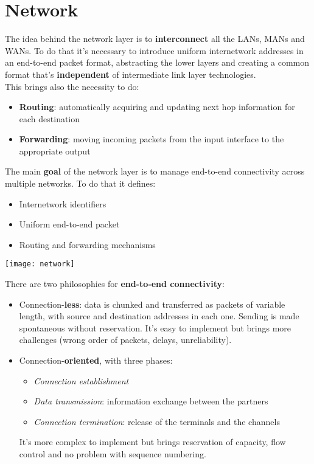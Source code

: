 \newpage
\section{Network}
The idea behind the network layer is to \textbf{interconnect} all the LANs, MANs and WANs. To do that it's necessary to introduce uniform internetwork addresses in an end-to-end packet format, abstracting the lower layers and creating a common format that's \textbf{independent} of intermediate link layer technologies.\\
This brings also the necessity to do:
\begin{itemize}
	\item \textbf{Routing}: automatically acquiring and updating next hop information for each destination
	\item \textbf{Forwarding}: moving incoming packets from the input interface to the appropriate output
\end{itemize}

\noindent The main \textbf{goal} of the network layer is to manage end-to-end connectivity across multiple networks. To do that it defines:
\begin{itemize}
	\item Internetwork identifiers
	\item Uniform end-to-end packet
	\item Routing and forwarding mechanisms
\end{itemize}
\begin{center}
	\texttt{[image: network]}
\end{center}

\noindent There are two philosophies for \textbf{end-to-end connectivity}:
\begin{itemize}
	\item Connection-\textbf{less}: data is chunked and transferred as packets of variable length, with source and destination addresses in each one. Sending is made spontaneous without reservation. It's easy to implement but brings more challenges (wrong order of packets, delays, unreliability).
	\item Connection-\textbf{oriented}, with three phases:
	\begin{itemize}
		\item \textit{Connection establishment}
		\item \textit{Data transmission}: information exchange between the partners
		\item \textit{Connection termination}: release of the terminals and the channels
	\end{itemize}
	It's more complex to implement but brings reservation of capacity, flow control and no problem with sequence numbering.
\end{itemize}

